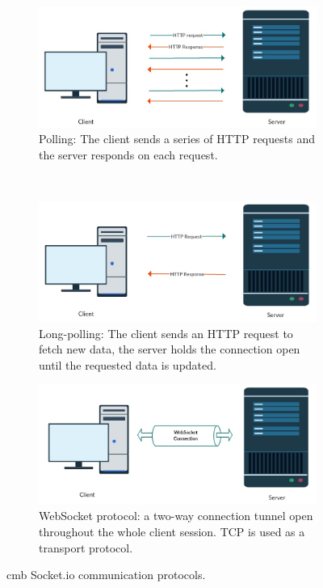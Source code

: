 \begin{figure}
    \centering
    \begin{subfigure}[b]{1.0\textwidth}
        \includegraphics[width=\textwidth]{figs/polling.jpg}
        \caption{Polling: The client sends a series of HTTP requests and the server responds on each request.}
        \label{fig:polling}
    \end{subfigure}
    ~ %
    \begin{subfigure}[b]{1.0\textwidth}
        \includegraphics[width=\textwidth]{figs/long_polling.jpg}
        \caption{Long-polling: The client sends an HTTP request to fetch new data, the server holds the connection open until the requested data is updated.}
        \label{fig:long-polling}
    \end{subfigure}
    \begin{subfigure}[b]{1.0\textwidth}
        \includegraphics[width=\textwidth]{figs/websocket.jpg}
        \caption{WebSocket protocol: a two-way connection tunnel open throughout the whole client session. TCP is used as a transport protocol.}
        \label{fig:websocket}
    \end{subfigure}
    \caption[Climbing Mont Blanc Socket.io communication protocols.]{\gls{cmb} Socket.io communication protocols.}\label{fig:cmb-protocols}
\end{figure}

